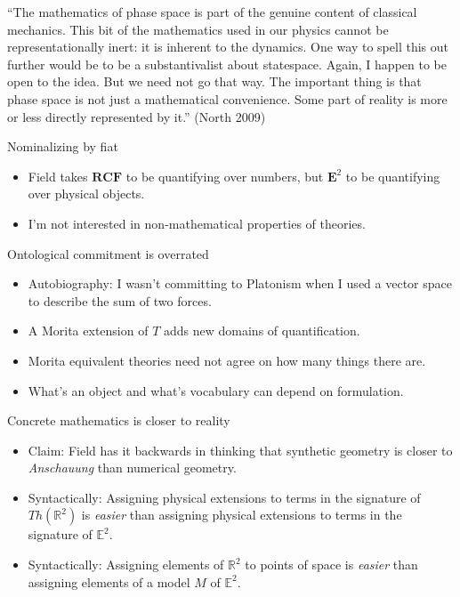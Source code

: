 \documentclass{beamer}
\begin{document}
\begin{frame}

  ``The mathematics of phase space is part of the genuine content of
  classical mechanics. This bit of the mathematics used in our physics
  cannot be representationally inert: it is inherent to the
  dynamics. One way to spell this out further would be to be a
  substantivalist about statespace. Again, I happen to be open to the
  idea. But we need not go that way. The important thing is that phase
  space is not just a mathematical convenience. Some part of reality
  is more or less directly represented by it.'' (North 2009)

\end{frame}


\begin{frame}{Nominalizing by fiat}

  \begin{itemize}
  \item Field takes $\mathbf{RCF}$ to be quantifying over numbers, but
    $\mathbf{E}^2$ to be quantifying over physical objects.
  \item I'm not interested in non-mathematical properties of theories.
  \end{itemize}
  
\end{frame}


\begin{frame}{Ontological commitment is overrated}

  \begin{itemize}
  \item Autobiography: I wasn't committing to Platonism when I used a
    vector space to describe the sum of two forces.
  \item A Morita extension of $T$ adds new domains of quantification.
  \item Morita equivalent theories need not agree on how many things
    there are.
  \item What's an object and what's vocabulary can depend on
    formulation.
  \end{itemize}
  
\end{frame}




\begin{frame}{Concrete mathematics is closer to reality}

  \begin{itemize}
  \item Claim: Field has it backwards in thinking that synthetic
    geometry is closer to \emph{Anschauung} than numerical geometry.
  \item Syntactically: Assigning physical extensions to terms in the
    signature of $Th(\mathbb{R}^2)$ is \emph{easier} than assigning
    physical extensions to terms in the signature of $\mathbb{E}^2$.
  \item Syntactically: Assigning elements of $\mathbb{R}^2$ to points
    of space is \emph{easier} than assigning elements of a model $M$
    of $\mathbb{E}^2$.
  \end{itemize}

\end{frame}
\end{document}

